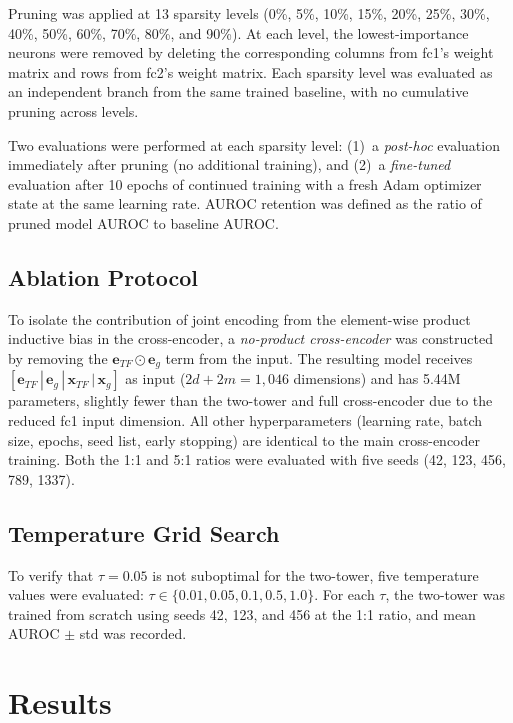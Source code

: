 \documentclass[journal]{IEEEtran}
\begin{document}
Pruning was applied at 13 sparsity levels (0\%, 5\%, 10\%, 15\%, 20\%, 25\%,
30\%, 40\%, 50\%, 60\%, 70\%, 80\%, and 90\%). At each level, the
lowest-importance neurons were removed by deleting the corresponding columns
from fc1's weight matrix and rows from fc2's weight matrix. Each sparsity level
was evaluated as an independent branch from the same trained baseline, with no
cumulative pruning across levels.

Two evaluations were performed at each sparsity level: (1)~a \emph{post-hoc}
evaluation immediately after pruning (no additional training), and
(2)~a \emph{fine-tuned} evaluation after 10 epochs of continued training with
a fresh Adam optimizer state at the same learning rate. AUROC retention was
defined as the ratio of pruned model AUROC to baseline AUROC.

\subsection{Ablation Protocol}
\label{ssec:ablation_method}

To isolate the contribution of joint encoding from the element-wise product
inductive bias in the cross-encoder, a \emph{no-product cross-encoder} was
constructed by removing the $\mathbf{e}_{TF} \odot \mathbf{e}_g$ term from
the input. The resulting model receives
$[\mathbf{e}_{TF} \,|\, \mathbf{e}_g \,|\, \mathbf{x}_{TF} \,|\, \mathbf{x}_g]$
as input ($2d + 2m = 1{,}046$ dimensions) and has 5.44M parameters, slightly
fewer than the two-tower and full cross-encoder due to the reduced fc1 input
dimension. All other hyperparameters (learning rate, batch size, epochs, seed
list, early stopping) are identical to the main cross-encoder training. Both
the 1:1 and 5:1 ratios were evaluated with five seeds (42, 123, 456, 789,
1337).

\subsection{Temperature Grid Search}
\label{ssec:tempsearch_method}

To verify that $\tau = 0.05$ is not suboptimal for the two-tower, five
temperature values were evaluated: $\tau \in \{0.01, 0.05, 0.1, 0.5, 1.0\}$.
For each $\tau$, the two-tower was trained from scratch using seeds 42, 123,
and 456 at the 1:1 ratio, and mean AUROC $\pm$ std was recorded.

\section{Results}
\label{sec:results}
\end{document}
